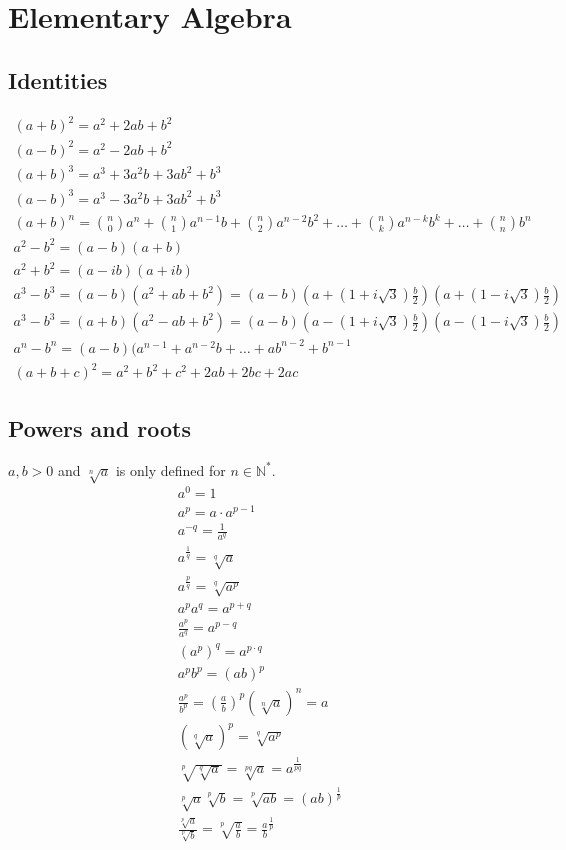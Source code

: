 \chapter{Elementary Algebra}

\section{Identities}
\begin{eqnarray}
	(a+b)^2=a^2+2ab+b^2\\
	(a-b)^2=a^2-2ab+b^2\\
	(a+b)^3=a^3+3a^2b+3ab^2+b^3\\
	(a-b)^3=a^3-3a^2b+3ab^2+b^3\\
	(a+b)^n={n\choose 0}a^n+{n\choose 1}a^{n-1}b+{n\choose 2}a^{n-2}b^2+\dots+{n\choose k}a^{n-k}b^k+\dots+{n\choose n}b^n\\
	a^2-b^2=(a-b)(a+b)\\
	a^2+b^2=(a-ib)(a+ib)\\
	a^3-b^3=(a-b)(a^2+ab+b^2)=(a-b)\left(a+(1+i\sqrt3)\frac{b}{2}\right)\left(a+(1-i\sqrt3)\frac{b}{2}\right)\\
	a^3-b^3=(a+b)(a^2-ab+b^2)=(a-b)\left(a-(1+i\sqrt3)\frac{b}{2}\right)\left(a-(1-i\sqrt3)\frac{b}{2}\right)\\
	a^n-b^n=(a-b)(a^{n-1}+a^{n-2}b+\dots+ab^{n-2}+b^{n-1}\\
	(a+b+c)^2=a^2+b^2+c^2+2ab+2bc+2ac
\end{eqnarray}

\section{Powers and roots}
$a, b>0$ and $\sqrt[n]{a}$ is only defined for $n\in\mathbb N^*$.
\begin{eqnarray}
	a^0=1\\
	a^p=a\cdot a^{p-1}\\
	a^{-q}=\frac{1}{a^q}\\
	a^{\frac{1}{q}}=\sqrt[q]{a}\\
	a^{\frac{p}{q}}=\sqrt[q]{a^p}\\
	a^pa^q=a^{p+q}\\
	\frac{a^p}{a^q}=a^{p-q}\\
	(a^p)^q=a^{p\cdot q}\\
	a^pb^p=(ab)^p\\
	\frac{a^p}{b^p}=\left(\frac{a}{b}\right)^p
	\left(\sqrt[n]{a}\right)^n=a\\
	\left(\sqrt[q]{a}\right)^p=\sqrt[q]{a^p}\\
	\sqrt[p]{\sqrt[q]{a}}=\sqrt[pq]{a}=a^{\frac{1}{pq}}\\
	\sqrt[p]{a}\sqrt[p]{b}=\sqrt[p]{ab}=(ab)^{\frac{1}{p}}\\
	\frac{\sqrt[p]{a}}{\sqrt[p]{b}}=\sqrt[p]{\frac{a}{b}}=\frac{a}{b}^{\frac{1}{p}}
\end{eqnarray}

